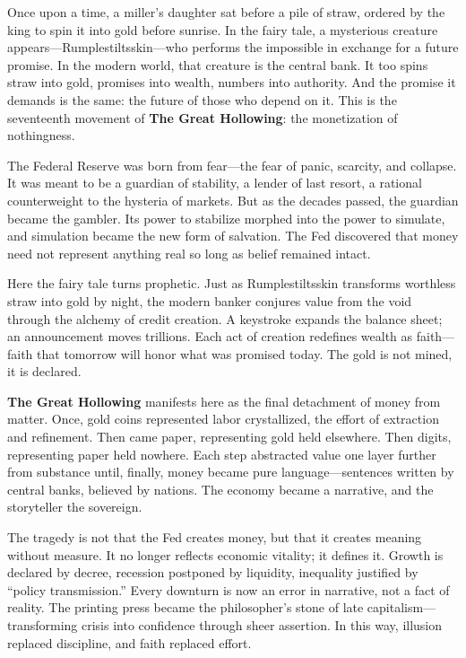 \documentclass[11pt,twoside]{book}
\begin{document}
Once upon a time, a miller’s daughter sat before a pile of straw, ordered by the king to spin it into gold before sunrise.  
In the fairy tale, a mysterious creature appears—Rumplestiltsskin—who performs the impossible in exchange for a future promise.  
In the modern world, that creature is the central bank.  
It too spins straw into gold, promises into wealth, numbers into authority.  
And the promise it demands is the same: the future of those who depend on it.  
This is the seventeenth movement of \textbf{The Great Hollowing}: the monetization of nothingness.

The Federal Reserve was born from fear—the fear of panic, scarcity, and collapse.  
It was meant to be a guardian of stability, a lender of last resort, a rational counterweight to the hysteria of markets.  
But as the decades passed, the guardian became the gambler.  
Its power to stabilize morphed into the power to simulate, and simulation became the new form of salvation.  
The Fed discovered that money need not represent anything real so long as belief remained intact.

Here the fairy tale turns prophetic.  
Just as Rumplestiltsskin transforms worthless straw into gold by night, the modern banker conjures value from the void through the alchemy of credit creation.  
A keystroke expands the balance sheet; an announcement moves trillions.  
Each act of creation redefines wealth as faith—faith that tomorrow will honor what was promised today.  
The gold is not mined, it is declared.

\textbf{The Great Hollowing} manifests here as the final detachment of money from matter.  
Once, gold coins represented labor crystallized, the effort of extraction and refinement.  
Then came paper, representing gold held elsewhere.  
Then digits, representing paper held nowhere.  
Each step abstracted value one layer further from substance until, finally, money became pure language—sentences written by central banks, believed by nations.  
The economy became a narrative, and the storyteller the sovereign.

The tragedy is not that the Fed creates money, but that it creates meaning without measure.  
It no longer reflects economic vitality; it defines it.  
Growth is declared by decree, recession postponed by liquidity, inequality justified by “policy transmission.”  
Every downturn is now an error in narrative, not a fact of reality.  
The printing press became the philosopher’s stone of late capitalism—transforming crisis into confidence through sheer assertion.  
In this way, illusion replaced discipline, and faith replaced effort.
\end{document}

